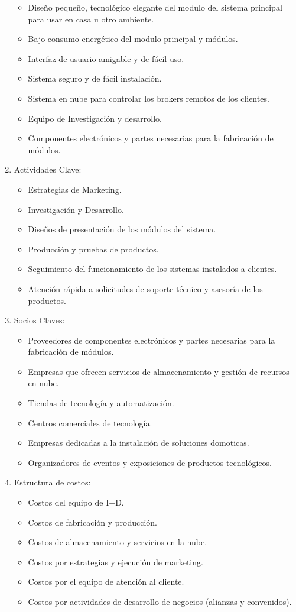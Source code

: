 \documentclass[11pt]{charter}
\begin{document}
\begin{enumerate}
\begin{itemize}
\item Diseño pequeño, tecnológico elegante del modulo del sistema principal para usar en casa u otro ambiente.
\item Bajo consumo energético del modulo principal y módulos.
\item Interfaz de usuario amigable y de fácil uso.
\item Sistema seguro y de fácil instalación.
\item Sistema en nube para controlar los brokers remotos de los clientes.
\item Equipo de Investigación y desarrollo.
\item Componentes electrónicos y partes necesarias para la fabricación de módulos.
\end{itemize}
\item Actividades Clave:
\begin{itemize}
\item Estrategias de Marketing.
\item Investigación y Desarrollo.
\item Diseños de presentación de los módulos del sistema.
\item Producción y pruebas de productos.
\item Seguimiento del funcionamiento de los sistemas instalados a clientes.
\item Atención rápida a solicitudes de soporte técnico y asesoría de los productos. 
\end{itemize}
\item Socios Claves:
\begin{itemize}
\item Proveedores de componentes electrónicos y partes necesarias para la fabricación de módulos.
\item Empresas que ofrecen servicios de almacenamiento y gestión de recursos en nube.
\item Tiendas de tecnología y automatización.
\item Centros comerciales de tecnología.
\item Empresas dedicadas a la instalación de soluciones domoticas.
\item Organizadores de eventos y exposiciones de productos tecnológicos.
\end{itemize}
\item Estructura de costos:
\begin{itemize}
\item Costos del equipo de I+D.
\item Costos de fabricación y producción.
\item Costos de almacenamiento y servicios en la nube.
\item Costos por estrategias y ejecución de marketing.
\item Costos por el equipo de atención al cliente.
\item Costos por actividades de desarrollo de negocios (alianzas y convenidos).
\end{itemize}
\end{enumerate}
\end{document}

